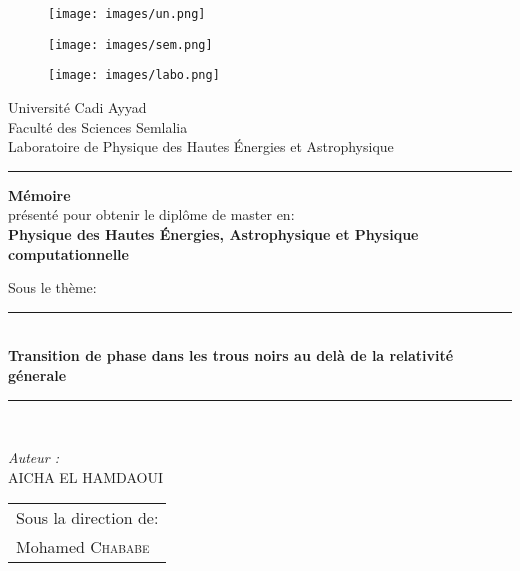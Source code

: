 \documentclass[12pt,  a4paper, openright]{report} %
\newcommand{\reporttitle}{Transition de phase dans les trous noirs au delà de la relativité génerale}     %
\newcommand{\reportauthor}{AICHA \textsc{EL HAMDAOUI}} %
\newcommand{\reportsubject}{\textbf{Mémoire}\\présenté pour obtenir le diplôme de master en: \\
	\textbf{Physique des Hautes Énergies, Astrophysique et Physique computationnelle  }  } %
\newcommand{\HRule}{\rule{\linewidth}{0.7mm}}
\begin{document}
	




\begin{titlepage}
	
	\begin{figure}[h!]
		\begin{minipage}[b]{0.25\linewidth}
			\begin{center}
				\texttt{[image: images/un.png]}
			\end{center}
			
		\end{minipage}\hfill
		\begin{minipage}[b]{0.45\linewidth}   
			\begin{center}
				\texttt{[image: images/sem.png]}
			\end{center}
			
		\end{minipage}
		\begin{minipage}[b]{0.27\linewidth}
			\begin{center}
				\texttt{[image: images/labo.png]}
			\end{center}
			
		\end{minipage}\hfill
		
	\end{figure}
	\begin{center}
		\huge{ Université Cadi Ayyad} \\
		\large Faculté des Sciences Semlalia\\
		Laboratoire de Physique des Hautes Énergies et Astrophysique
	\end{center}
	
	\HRule 
	\begin{center}
		
		{\Large \reportsubject}\\[0.5cm]
		\vspace{0.4cm}
		
		
		\Large Sous le thème:\\
		\HRule \\[0.8cm]
		{\Huge \bfseries \reporttitle}\\[0.4cm]
		
		\HRule \\[0.8cm]
		
		\begin{Large}
			
			\begin{minipage}[b]{0.45\linewidth}
				\begin{flushleft}
					\emph{Auteur :}\\
					\reportauthor
				\end{flushleft}       
			\end{minipage}
			\begin{minipage}[b]{0.45\linewidth}   
				\begin{flushright}
					\begin{tabular}{l}
						Sous la direction de: \\
						Mohamed \textsc{Chababe} 
		

\end{tabular}
\end{flushright}
\end{minipage}
\end{Large}
\end{center}
\end{titlepage}
\end{document}
